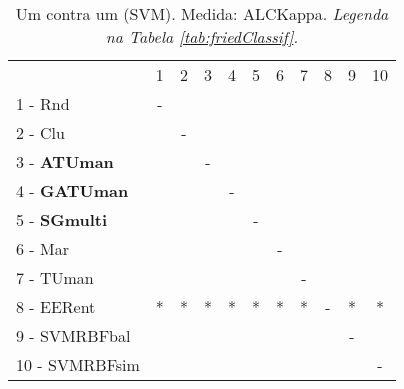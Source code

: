 \begin{table}[h]
\caption{Um contra um (SVM). Medida: ALCKappa. \textit{Legenda na Tabela \ref{tab:friedClassif}.}}
\begin{center}\begin{tabular}{lcc|cc|cc|cc|cc}
 			& 1 & 2 & 3 & 4 & 5 & 6 & 7 & 8 & 9 & 10\\
1 - Rnd  	& - &   &   &   &   &   &   &   &   &   \\
2 - Clu  	&   & - &   &   &   &   &   &   &   &   \\ \hline
3 - \textbf{ATUman}	&   &   & - &   &   &   &   &   &   &   \\
4 - \textbf{GATUman}	&   &   &   & - &   &   &   &   &   &   \\ \hline
5 - \textbf{SGmulti}	&   &   &   &   & - &   &   &   &   &   \\
6 - Mar  	&   &   &   &   &   & - &   &   &   &   \\ \hline
7 - TUman	&   &   &   &   &   &   & - &   &   &   \\
8 - EERent	& * & * & * & * & * & * & * & - & * & * \\ \hline
9 - SVMRBFbal	&   &   &   &   &   &   &   &   & - &   \\
10 - SVMRBFsim	&   &   &   &   &   &   &   &   &   & - \\ \hline\end{tabular}
\label{stratsALCKappaFriedSVMRedux}
\end{center}
\end{table}